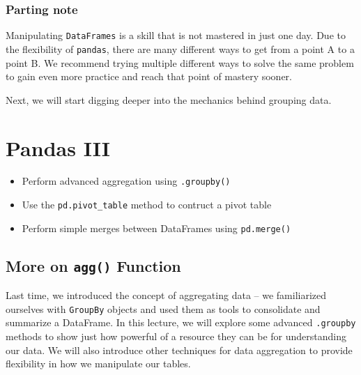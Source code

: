 \documentclass[
  letterpaper,
  DIV=11,
  numbers=noendperiod]{scrreprt}
\providecommand{\tightlist}{%
  \setlength{\itemsep}{0pt}\setlength{\parskip}{0pt}}\usepackage{longtable,booktabs,array}
\begin{document}
\hypertarget{parting-note-1}{%
\subsection{Parting note}\label{parting-note-1}}

Manipulating \texttt{DataFrames} is a skill that is not mastered in just
one day. Due to the flexibility of \texttt{pandas}, there are many
different ways to get from a point A to a point B. We recommend trying
multiple different ways to solve the same problem to gain even more
practice and reach that point of mastery sooner.

Next, we will start digging deeper into the mechanics behind grouping
data.


\hypertarget{pandas-iii}{%
\chapter{Pandas III}\label{pandas-iii}}

\begin{tcolorbox}[enhanced jigsaw, rightrule=.15mm, opacityback=0, colbacktitle=quarto-callout-note-color!10!white, opacitybacktitle=0.6, coltitle=black, toptitle=1mm, colback=white, toprule=.15mm, leftrule=.75mm, breakable, bottomtitle=1mm, bottomrule=.15mm, arc=.35mm, title=\textcolor{quarto-callout-note-color}{\faInfo}\hspace{0.5em}{Note}, colframe=quarto-callout-note-color-frame, titlerule=0mm, left=2mm]

\begin{itemize}
\tightlist
\item
  Perform advanced aggregation using \texttt{.groupby()}
\item
  Use the \texttt{pd.pivot\_table} method to contruct a pivot table
\item
  Perform simple merges between DataFrames using \texttt{pd.merge()}
\end{itemize}

\end{tcolorbox}

\hypertarget{more-on-agg-function}{%
\section{\texorpdfstring{More on \texttt{agg()}
Function}{More on agg() Function}}\label{more-on-agg-function}}

Last time, we introduced the concept of aggregating data -- we
familiarized ourselves with \texttt{GroupBy} objects and used them as
tools to consolidate and summarize a DataFrame. In this lecture, we will
explore some advanced \texttt{.groupby} methods to show just how
powerful of a resource they can be for understanding our data. We will
also introduce other techniques for data aggregation to provide
flexibility in how we manipulate our tables.
\end{document}
